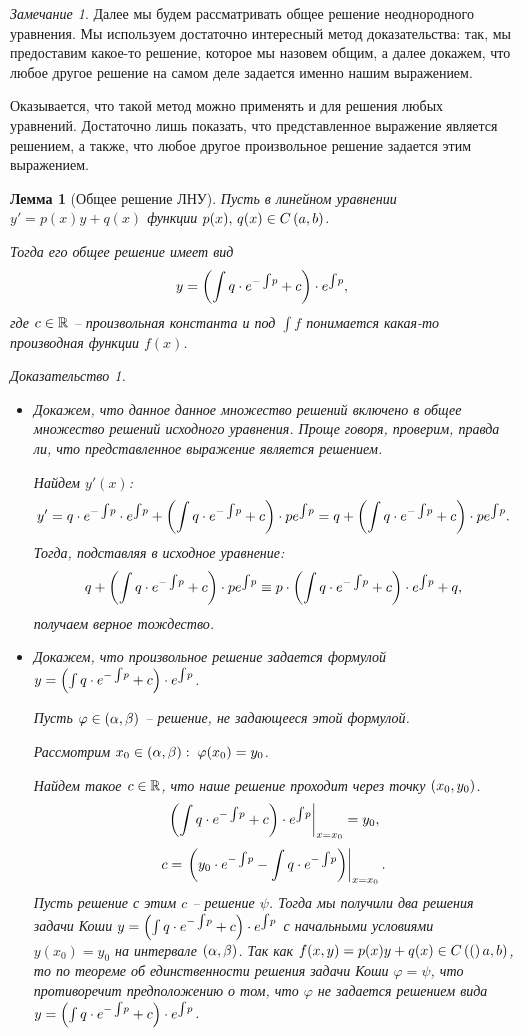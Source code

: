 \documentclass[a5paper, 10pt]{article}
\theoremstyle{definition}
\theoremstyle{plain}
\newtheorem{Lem}{Лемма}
\theoremstyle{remark}
\newtheorem*{Note}{Замечание}
\newtheorem*{Proof}{Доказательство}
\begin{document}
	\begin{Note}
		Далее мы будем рассматривать общее решение неоднородного уравнения. Мы используем достаточно интересный метод доказательства: так, мы предоставим какое-то решение, которое мы назовем общим, а далее докажем, что любое другое решение на самом деле задается именно нашим выражением. 
		
		Оказывается, что такой метод можно применять и для решения любых уравнений. Достаточно лишь показать, что представленное выражение является решением, а также, что любое другое произвольное решение задается этим выражением.
	\end{Note}
	\begin{Lem}[Общее решение ЛНУ]
		Пусть в линейном уравнении $y' = p(x) y + q(x)$ функции $p(x),\, q(x) \in C\left(a,b\right)$.
		
		Тогда его общее решение имеет вид \begin{equation}
			y = \left(\int q \cdot e^{-\int\!p} + c\right) \cdot e^{\int \! p},
		\end{equation}
		где $c\in \mathbb{R}$ -- произвольная константа и под $\int \!f$ понимается какая-то производная функции $f(x)$.
		\begin{Proof}
			\begin{itemize}
				\item Докажем, что данное данное множество решений включено в общее множество решений исходного уравнения. Проще говоря, проверим, правда ли, что представленное выражение является решением.
				
				Найдем $y'(x)$:
				\[
				y' = q\cdot e^{-\int\! p} \cdot e^{\int\!p} + \left(\int q\cdot e^{-\int\!p} + c\right) \cdot p e^{\int\!p} = q + \left(\int q\cdot e^{-\int\!p} + c\right) \cdot p e^{\int\!p}.
				\]
				Тогда, подставляя в исходное уравнение:
				\[
				q + \left(\int q\cdot e^{-\int\!p} + c\right) \cdot p e^{\int\!p} \equiv p \cdot \left(\int q \cdot e^{-\int\!p} + c\right) \cdot e^{\int \! p} + q,
				\]
				получаем верное тождество.
				\item Докажем, что произвольное решение задается формулой $y = \left(\int q \cdot e^{-\int\!p} + c\right) \cdot e^{\int \! p}$.
				
				Пусть $\varphi \in \left(\alpha,\beta\right)$ -- решение, не задающееся этой формулой.
				
				Рассмотрим $x_0 \in \left(\alpha, \beta\right) : \; \varphi(x_0) = y_0$.
				
				Найдем такое $c \in \mathbb{R}$, что наше решение проходит через точку $\left(x_0, y_0\right)$. 
				\[
				\left. \left(\int q \cdot e^{-\int\!p} + c\right) \cdot e^{\int \! p} \right|_{x=x_0} = y_0,
				\]
				\[
				c = \left. \left(y_0 \cdot e^{-\int\!p} - \int q\cdot e^{-\int\!p}\right) \right|_{x=x_0}.
				\]
				Пусть решение с этим $c$ -- решение $\psi$. Тогда мы получили два решения задачи Коши $y = \left(\int q \cdot e^{-\int\!p} + c\right) \cdot e^{\int \! p}$ с начальными условиями $y(x_0) = y_0$ на интервале $\left(\alpha,\beta\right)$. Так как $f(x, y) = p(x) y+q(x) \in C\left((\right)a,b)$, то по теореме об единственности решения задачи Коши $\varphi = \psi$, что противоречит предположению о том, что $\varphi$ не задается решением вида $	y = \left(\int q \cdot e^{-\int\!p} + c\right) \cdot e^{\int \! p}$. 
				

\end{itemize}
\end{Proof}
\end{Lem}
\end{document}
